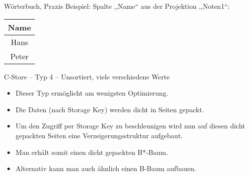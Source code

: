 \begin{frame}{W\"orterbuch, Praxis}
Beispiel: Spalte ,,Name`` aus der Projektion ,,Noten1``:
\vspace{5mm}

\begin{tabular}{|c|}
	\hline
	Name  \\ \hline
	Hans  \\ \hline
	Peter \\ \hline
\end{tabular}
\end{frame}

\begin{frame}{C-Store -- Typ 4 -- Unsortiert, viele verschiedene Werte}
\begin{itemize}[<+->]
	\item Dieser Typ erm\"oglicht am wenigsten Optimierung.
	\item Die Daten (nach Storage Key) werden dicht in Seiten gepackt.
	\item Um den Zugriff per Storage Key zu beschleunigen wird nun auf diesen dicht gepackten Seiten eine Verzeigerungsstruktur aufgebaut.
	\item Man erhält somit einen dicht gepackten B*-Baum.
	\item Alternativ kann man auch ähnlich einen B-Baum aufbauen.
\end{itemize}
\end{frame}

